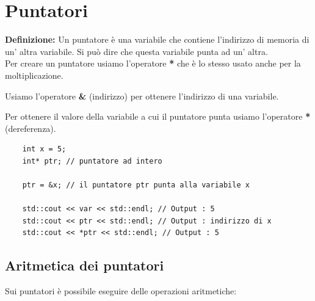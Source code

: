




\newpage

\section{Puntatori}

\textsf{\small \textbf{Definizione: } Un puntatore è una variabile che contiene l'indirizzo di memoria di un' altra variabile. Si può dire che questa variabile punta ad un' altra.} \\

\textsf{\small Per creare un puntatore usiamo l'operatore \textbf{*} che è lo stesso usato anche per la moltiplicazione.}

\textsf{\small Usiamo l'operatore \textbf{\&} (indirizzo) per ottenere l'indirizzo di una variabile.} 

\textsf{\small Per ottenere il valore della variabile a cui il puntatore punta usiamo l'operatore \textbf{*} (dereferenza).}\\

\begin{lstlisting}
	int x = 5;
	int* ptr; // puntatore ad intero
	
	ptr = &x; // il puntatore ptr punta alla variabile x
	
	std::cout << var << std::endl; // Output : 5
	std::cout << ptr << std::endl; // Output : indirizzo di x
	std::cout << *ptr << std::endl; // Output : 5
\end{lstlisting}

\subsection{Aritmetica dei puntatori}

\textsf{\small Sui puntatori è possibile eseguire delle operazioni aritmetiche:} \\

